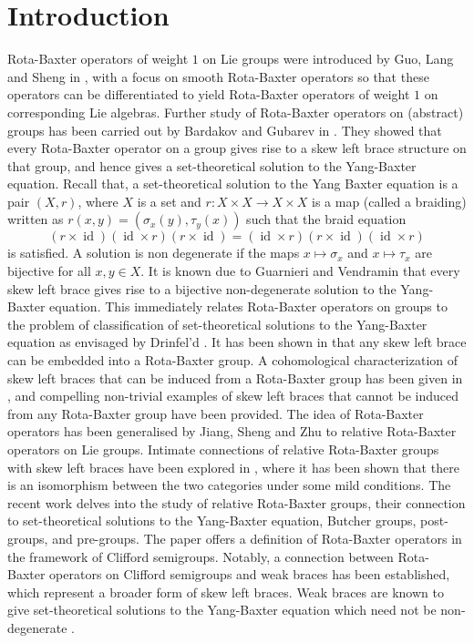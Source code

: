 \documentclass[11pt]{amsart}
\theoremstyle{thrm}
\theoremstyle{plain}
\theoremstyle{definition}
\newcommand{\Id}{\operatorname{id}}
\numberwithin{equation}{section}
\begin{document}
\section{Introduction}
Rota-Baxter operators of weight $1$ on Lie groups were introduced by  Guo, Lang and Sheng in \cite{LHY2021}, with a focus on smooth Rota-Baxter operators so that these operators can be differentiated to yield Rota-Baxter operators of weight $1$ on corresponding Lie algebras. Further study of Rota-Baxter operators on (abstract) groups has been carried out by Bardakov and Gubarev in \cite{VV2022, VV2023}. They showed that every Rota-Baxter operator on a group gives rise to a skew left brace structure on that group, and hence gives a set-theoretical solution to the Yang-Baxter equation. Recall that, a set-theoretical solution to the  Yang Baxter equation is a pair $(X, r)$, where $X$ is a set and $ r: X\times X \longrightarrow X\times X$ is a map (called a braiding) written as $r(x,y) = (\sigma_x(y), \tau_y(x))$ such that the braid equation 
$$(r\times \Id)(\Id \times r)(r\times \Id)=(\Id \times r)(r\times \Id)( \Id \times r)$$
is satisfied. A solution is non degenerate if the maps $x \mapsto \sigma_x$ and $x \mapsto \tau_x$ are bijective for all $x, y \in X$. It is known due to Guarnieri and Vendramin \cite{GV17} that every skew left brace gives rise to a bijective non-degenerate solution to the Yang-Baxter equation. This immediately relates Rota-Baxter operators on groups to the problem of classification of set-theoretical solutions to the  Yang-Baxter equation as envisaged by Drinfel'd \cite{MR1183474}.  It has been shown in \cite{VV2022} that any skew left brace can be embedded into a Rota-Baxter group. A cohomological characterization of skew left braces that can be induced from a Rota-Baxter group has been given in \cite{AS22}, and compelling non-trivial examples of skew left braces that cannot be induced from any Rota-Baxter group have been provided.   The idea of Rota-Baxter operators has been generalised by Jiang, Sheng and Zhu \cite{JYC22} to relative Rota-Baxter operators on Lie groups. Intimate connections of relative Rota-Baxter groups with skew left braces have been explored in \cite{NM1}, where it has been shown that there is an isomorphism between the two categories under some mild conditions.  The recent work \cite{BGST} delves into the study of relative Rota-Baxter groups, their connection to set-theoretical solutions to the  Yang-Baxter equation, Butcher groups, post-groups, and pre-groups. The paper \cite{CMP} offers a definition of Rota-Baxter operators in the framework of Clifford semigroups. Notably, a  connection between Rota-Baxter operators on Clifford semigroups and weak braces has been established, which represent a broader form of skew left braces. Weak braces are  known  to give set-theoretical solutions to the Yang-Baxter equation which need not be non-degenerate \cite{CMMS}.
\par
\end{document}
